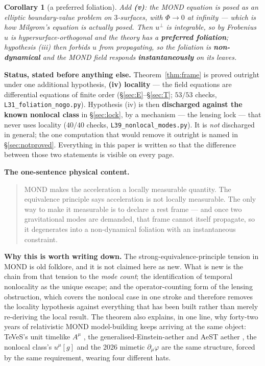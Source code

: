 \documentclass[11pt,letterpaper]{article}
\newtheorem{corollary}{Corollary}
\begin{document}
\begin{corollary}[a preferred foliation]\label{cor:fol}
Add \textbf{(v)}: the MOND equation is posed as an elliptic boundary-value problem on $3$-surfaces, with $\Phi\to0$ at infinity --- which is how Milgrom's equation is actually posed. Then $u^\perp$ is integrable, so by Frobenius $u$ is hypersurface-orthogonal and the theory has a \textbf{preferred foliation}; hypothesis (iii) then forbids $u$ from propagating, so the foliation is \textbf{non-dynamical} and the MOND field responds \textbf{instantaneously} on its leaves.
\end{corollary}

\textbf{Status, stated before anything else.} Theorem~\ref{thm:frame} is proved outright under one additional hypothesis, \textbf{(iv) locality} --- the field equations are differential equations of finite order (\S\ref{sec:E}--\S\ref{sec:T}; $53/53$ checks, \texttt{L31\_foliation\_nogo.py}). Hypothesis (iv) is then \textbf{discharged against the known nonlocal class} in \S\ref{sec:lock}, by a mechanism --- the lensing lock --- that never uses locality ($40/40$ checks, \texttt{L39\_nonlocal\_modes.py}). It is \emph{not} discharged in general; the one computation that would remove it outright is named in \S\ref{sec:notproved}. Everything in this paper is written so that the difference between those two statements is visible on every page.

\textbf{The one-sentence physical content.}
\begin{quote}
MOND makes the acceleration a locally measurable quantity. The equivalence principle says acceleration is not locally measurable. The only way to make it measurable is to declare a rest frame --- and once two gravitational modes are demanded, that frame cannot itself propagate, so it degenerates into a non-dynamical foliation with an instantaneous constraint.
\end{quote}

\textbf{Why this is worth writing down.} The strong-equivalence-principle tension in MOND is old folklore, and it is not claimed here as new. What is new is the chain from that tension to the \emph{mode count}; the identification of temporal nonlocality as the unique escape; and the operator-counting form of the lensing obstruction, which covers the nonlocal case in one stroke and therefore removes the locality hypothesis against everything that has been built rather than merely re-deriving the local result. The theorem also explains, in one line, why forty-two years of relativistic MOND model-building keeps arriving at the same object: TeVeS's unit timelike $A^\mu$ \cite{Bekenstein2004}, the generalised-Einstein-aether and AeST aether \cite{Zlosnik2007,SkordisZlosnik2021}, the nonlocal class's $u^\mu[g]$ \cite{Deffayet2011} and the 2026 mimetic $\partial_\mu\varphi$ \cite{DeffayetWoodard2026} are the same structure, forced by the same requirement, wearing four different hats.
\end{document}
